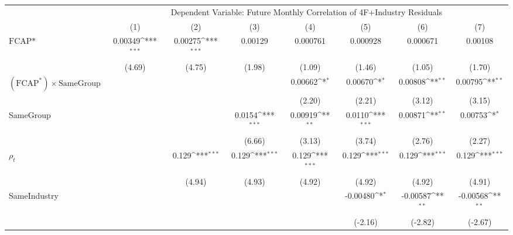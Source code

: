 {
\def\sym#1{\ifmmode^{#1}\else\(^{#1}\)\fi}
\begin{tabular}{l*{7}{c}}
\hline\hline
                &\multicolumn{7}{c}{Dependent Variable: Future Monthly Correlation of 4F+Industry Residuals}                                         \\\cmidrule(lr){2-8}
                &\multicolumn{1}{c}{(1)}         &\multicolumn{1}{c}{(2)}         &\multicolumn{1}{c}{(3)}         &\multicolumn{1}{c}{(4)}         &\multicolumn{1}{c}{(5)}         &\multicolumn{1}{c}{(6)}         &\multicolumn{1}{c}{(7)}         \\
\hline
$ \text{FCAP*} $&  0.00349\sym{***}&  0.00275\sym{***}&  0.00129         & 0.000761         & 0.000928         & 0.000671         &  0.00108         \\
                &   (4.69)         &   (4.75)         &   (1.98)         &   (1.09)         &   (1.46)         &   (1.05)         &   (1.70)         \\
[1em]
 $ (\text{FCAP}^*) \times {\text{SameGroup} }  $ &                  &                  &                  &  0.00662\sym{*}  &  0.00670\sym{*}  &  0.00808\sym{**} &  0.00795\sym{**} \\
                &                  &                  &                  &   (2.20)         &   (2.21)         &   (3.12)         &   (3.15)         \\
[1em]
SameGroup       &                  &                  &   0.0154\sym{***}&  0.00919\sym{**} &   0.0110\sym{***}&  0.00871\sym{**} &  0.00753\sym{*}  \\
                &                  &                  &   (6.66)         &   (3.13)         &   (3.74)         &   (2.76)         &   (2.27)         \\
[1em]
 $ {\rho_t} $   &                  &    0.129\sym{***}&    0.129\sym{***}&    0.129\sym{***}&    0.129\sym{***}&    0.129\sym{***}&    0.129\sym{***}\\
                &                  &   (4.94)         &   (4.93)         &   (4.92)         &   (4.92)         &   (4.92)         &   (4.91)         \\
[1em]
SameIndustry    &                  &                  &                  &                  & -0.00480\sym{*}  & -0.00587\sym{**} & -0.00568\sym{**} \\
                &                  &                  &                  &                  &  (-2.16)         &  (-2.82)         &  (-2.67)         \\

\end{tabular}}
